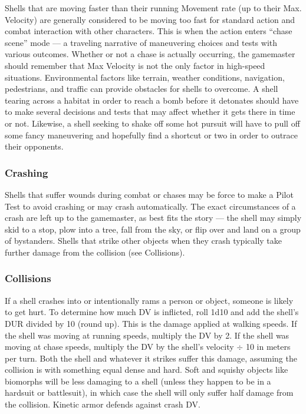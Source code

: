 Shells that are moving faster than their running Movement rate (up to their Max. Velocity) are generally considered to be moving too fast for standard action and combat interaction with other characters. This is when the action enters ``chase scene'' mode --- a traveling narrative of maneuvering choices and tests with various outcomes. Whether or not a chase is actually occurring, the gamemaster should remember that Max Velocity is not the only factor in high-speed situations. Environmental factors like terrain, weather conditions, navigation, pedestrians, and traffic can provide obstacles for shells to overcome. A shell tearing across a habitat in order to reach a bomb before it detonates should have to make several decisions and tests that may affect whether it gets there in time or not. Likewise, a shell seeking to shake off some hot pursuit will have to pull off some fancy maneuvering and hopefully find a shortcut or two in order to outrace their opponents.

\subsubsection{Crashing}

Shells that suffer wounds during combat or chases may be force to make a Pilot Test to avoid crashing or may crash automatically. The exact circumstances of a crash are left up to the gamemaster, as best fits the story --- the shell may simply skid to a stop, plow into a tree, fall from the sky, or flip over and land on a group of bystanders. Shells that strike other objects when they crash typically take further damage from the collision (see Collisions).

\subsubsection{Collisions}

If a shell crashes into or intentionally rams a person or object, someone is likely to get hurt. To determine how much DV is inflicted, roll 1d10 and add the shell’s DUR divided by 10 (round up). This is the damage applied at walking speeds. If the shell was moving at running speeds, multiply the DV by 2. If the shell was moving at chase speeds, multiply the DV by the shell’s velocity $\div$ 10 in meters per turn. Both the shell and whatever it strikes suffer this damage, assuming the collision is with something equal dense and hard. Soft and squishy objects like biomorphs will be less damaging to a shell (unless they happen to be in a hardsuit or battlesuit), in which case the shell will only suffer half damage from the collision. Kinetic armor defends against crash DV.

